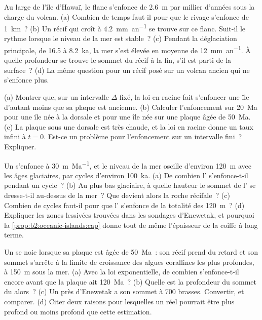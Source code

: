 \begin{exercise}[$\star\star$]\label{exo:b2:oceanic-islands:9}
Au large de l'île d'Hawaï, le flanc s'enfonce de \qty{2.6}{m} par millier d'années sous la charge du
volcan. (a) Combien de temps faut-il pour que le rivage s'enfonce de \qty{1}{km}~? (b) Un récif qui
croît à \qty{4.2}{mm.an^{-1}} se trouve sur ce flanc. Suit-il le rythme lorsque le niveau de la mer est
stable~? (c) Pendant la déglaciation principale, de 16.5 à \qty{8.2}{ka}, la mer s'est élevée en moyenne
de \qty{12}{mm.an^{-1}}. À quelle profondeur se trouve le sommet du récif à la fin, s'il est parti
de la surface~? (d) La même question pour un récif posé sur un volcan ancien qui ne s'enfonce plus.
\end{exercise}

\begin{exercise}[$\star\star\star$]\label{exo:b2:oceanic-islands:10}
(a) Montrer que, sur un intervalle $\Delta$ fixé, la loi en racine fait s'enfoncer une île d'autant moins que
sa plaque est ancienne. (b) Calculer l'enfoncement sur \qty{20}{Ma} pour une île née à la dorsale et pour
une île née sur une plaque âgée de \qty{50}{Ma}. (c) La plaque sous une dorsale est très chaude, et la loi en
racine donne un taux infini à $t = 0$. Est-ce un problème pour l'enfoncement sur un intervalle fini~? Expliquer.
\end{exercise}

\begin{exercise}[$\star\star\star$]\label{exo:b2:oceanic-islands:11}
Un  s'enfonce à \qty{30}{m.Ma^{-1}}, et le niveau de la mer oscille d'environ \qty{120}{m} avec les
âges glaciaires, par cycles d'environ \qty{100}{ka}. (a) De combien l' s'enfonce-t-il pendant un
cycle~? (b) Au plus bas glaciaire, à quelle hauteur le sommet de l' se dresse-t-il au-dessus de la
mer~? Que devient alors la roche récifale~? (c) Combien de cycles faut-il pour que l' s'enfonce de
la totalité des \qty{120}{m}~? (d) Expliquer les zones lessivées trouvées dans les sondages d'Enewetak, et
pourquoi la \cref{prop:b2:oceanic-islands:cap} donne tout de même l'épaisseur de la coiffe à long terme.
\end{exercise}

\begin{exercise}[$\star\star\star$]\label{exo:b2:oceanic-islands:12}
Un  se noie lorsque sa plaque est âgée de \qty{50}{Ma}~: son récif prend du retard et son sommet s'arrête
à la limite de croissance des algues corallines les plus profondes, à \qty{150}{m} sous la mer. (a) Avec la loi
exponentielle, de combien s'enfonce-t-il encore avant que la plaque ait \qty{120}{Ma}~? (b) Quelle est la profondeur
du sommet du  alors~? (c) Un  près d'Enewetak a son sommet à 700 brasses. Convertir, et comparer. (d)
Citer deux raisons pour lesquelles un  réel pourrait être plus profond ou moins profond que cette estimation.
\end{exercise}

